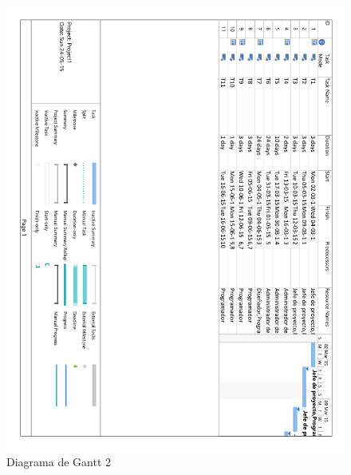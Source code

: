 \begin{figure}[!htp]
	\centering
	\includegraphics[page=2, scale=.7]{fig/real_gantt_diagram}
	\caption{Diagrama de Gantt 2}
\end{figure}

